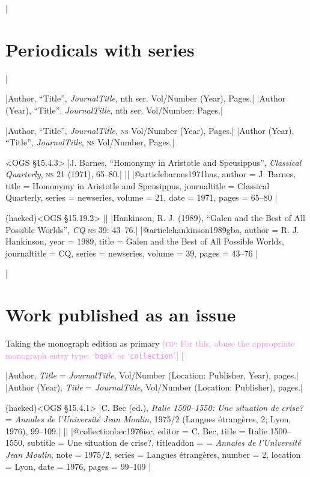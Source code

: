 \documentclass[extrafontsizes,11pt,a4paper,oneside]{memoir}
\newcommand*{\lit}[1]{\textsf{#1}}
\newcommand*{\code}[1]{`\texttt{#1}'}
\newcommand*{\aside}[1]{\textcolor{violet}{[\textsc{tip:} #1]}}
\begin{document}
\todoc|
\section{Periodicals with series}
|

\specs
|Author, \enquote{Title}, \emph{JournalTitle}, nth \lit{ser}. Vol/Number (Year), Pages.|%
|Author (Year), \enquote{Title}, \emph{JournalTitle}, nth \lit{ser}. Vol/Number: Pages.|

\specs
|Author, \enquote{Title}, \emph{JournalTitle}, \textsc{ns} Vol/Number (Year), Pages.|%
|Author (Year), \enquote{Title}, \emph{JournalTitle}, \textsc{ns} Vol/Number, Pages.|

\bibexample<OGS \S15.4.3>
|J. Barnes, \enquote{Homonymy in Aristotle and Speusippus}, \emph{Classical Quarterly}, \textsc{ns} 21 (1971), 65--80.|%
||%
|@article{barnes1971has,
  author = {J. Barnes},
  title = {Homonymy in Aristotle and Speusippus},
  journaltitle = {Classical Quarterly},
  series = {newseries},
  volume = {21},
  date = {1971},
  pages = {65--80}
}|

\bibexample(hacked)<OGS \S15.19.2>
||%
|Hankinson, R. J. (1989), \enquote{Galen and the Best of All Possible Worlds}, \emph{CQ} \textsc{ns} 39: 43–76.|%
|@article{hankinson1989gba,
  author = {R. J. Hankinson},
  year = {1989},
  title = {Galen and the Best of All Possible Worlds},
  journaltitle = {CQ\nopunct},
  series = {newseries},
  volume = {39},
  pages = {43–76}
}|

\todoc|
\section{Work published as an issue}

Taking the monograph edition as primary \aside{For this, abuse the appropriate monograph entry type: \code{book} or \code{collection}.}
|

\specs
|Author, \emph{Title} = \emph{JournalTitle}, Vol/Number (Location: Publisher, Year), pages.|%
|Author (Year), \emph{Title} = \emph{JournalTitle}, Vol/Number (Location: Publisher), pages.|

\bibexample(hacked)<OGS \S15.4.1>
|C. Bec (ed.), \emph{Italie 1500--1550: Une situation de crise?} = \emph{Annales de l'Université Jean Moulin}, 1975/2 (Langues étrangères, 2; Lyon, 1976), 99--109.|%
||%
|@collection{bec1976isc,
  editor = {C. Bec},
  title = {Italie 1500--1550},
  subtitle = {Une situation de crise?\nopunct},
  titleaddon = {= \emph{Annales de l'Université Jean Moulin}},
  note = {1975/2},
  series = {Langues étrangères},
  number = {2},
  location = {Lyon},
  date = {1976},
  pages = {99--109}
}|
  
\end{document}
